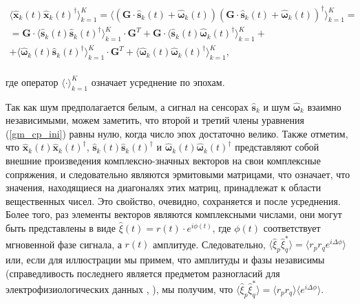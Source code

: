 \begin{gather}
           \langle{\hat{\mathbf{x     }}_k(t) \hat{\mathbf{x}}_k(t)^{\dag}} \rangle_{k=1}^K =
           \langle{(\mathbf{G} \cdot\hat{\mathbf{s}}_k(t) + \hat{\mathbf{\omega}}_k(t))
                                       (\mathbf{G} \cdot\hat{\mathbf{s}}_k(t) + \hat{\mathbf{\omega}}_k(t))^{\dag}}\rangle_{k=1}^K=\nonumber\\
= \mathbf{G}  \cdot \langle{\hat{\mathbf{s     }}_k(t) \hat{\mathbf{s     }}_k(t)^{\dag}} \rangle_{k=1}^K \cdot \mathbf{G}^T +
   \mathbf{G} \cdot \langle{\hat{\mathbf{s     }}_k(t) \hat{\mathbf{\omega}}_k(t)^{\dag}} \rangle_{k=1}^K + \nonumber\\
        +  \langle{\hat{\mathbf{\omega}}_k(t) \hat{\mathbf{s     }}_k(t)^{\dag}} \rangle_{k=1}^K \cdot \mathbf{G}^T +
           \langle{\hat{\mathbf{\omega}}_k(t) \hat{\mathbf{\omega}}_k(t)^{\dag}} \rangle_{k=1}^K,
    \label{gm_cp_ini}
\end{gather}
\\
где оператор $\langle \cdot \rangle_{k=1}^K$ означает усреднение по эпохам.

Так как шум предполагается белым, а сигнал на сенсорах $\hat{\mathbf{s}}_k$ и шум $\hat{\mathbf{\omega}}_k$ взаимно независимыми,
можем заметить, что второй и третий члены уравнения (\ref{gm_cp_ini}) равны нулю, когда число эпох достаточно велико.
Также отметим, что
$\hat{\mathbf{x     }}_k(t) \hat{\mathbf{x     }}_k(t)^{\dag}$,
$\hat{\mathbf{s     }}_k(t) \hat{\mathbf{s     }}_k(t)^{\dag}$ и
$\hat{\mathbf{\omega}}_k(t) \hat{\mathbf{\omega}}_k(t)^{\dag}$
представляют собой внешние произведения комплексно-значных векторов на свои комплексные сопряжения,
и следовательно являются эрмитовыми матрицами, что означает,
что значения, находящиеся на диагоналях этих матриц, принадлежат к области вещественных чисел.
Это свойство, очевидно, сохраняется и после усреднения.
Более того, раз элементы векторов являются комплексными числами, они могут быть представлены в виде
$\hat{\xi}(t) = r(t)\cdot e^{i\phi(t)}$, где $\phi(t)$ соответствует мгновенной фазе сигнала,
а $r(t)$ амплитуде. Следовательно,
$\langle \hat{\xi}_p \hat{\xi}_q^* \rangle = \langle r_p r_q e^{i\Delta\phi} \rangle$ или,
если для иллюстрации мы примем, что амплитуды и фазы независимы
(справедливость последнего является предметом разногласий для электрофизиологических данных \cite{Lachaux1999}, \cite{imcoh}),
мы получим, что
$\langle \hat{\xi}_p \hat{\xi}_q^* \rangle = \langle r_p r_q \rangle \langle e^{i\Delta\phi} \rangle$.

